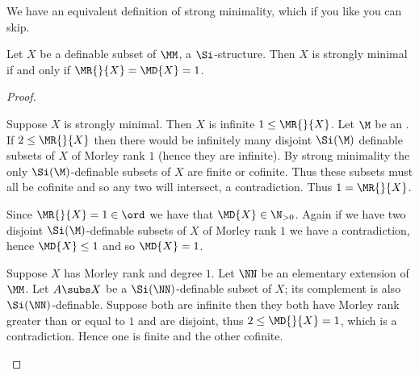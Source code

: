 We have an equivalent definition of strong minimality, 
which if you like you can skip.
\begin{prop}
    Let $X$ be a definable subset of $\MM$, a $\Si$-structure.
    Then $X$ is strongly minimal if and only if $\MR{}{X} = \MD{X} = 1$.
\end{prop}
\begin{proof}
    \begin{forward}
        Suppose $X$ is strongly minimal.
        Then $X$ is infinite 
         $1 \leq \MR{}{X}$.
        Let $\M$ be an 
        .
        If $2 \leq \MR{}{X}$ then there would be infinitely many 
        disjoint $\Si(\M)$ definable subsets of $X$ of Morley rank $1$
        (hence they are infinite).
        By strong minimality the only 
        $\Si(\M)$-definable subsets of $X$ are finite or cofinite.
        Thus these subsets must all be cofinite
        and so any two will intersect, a contradiction.
        Thus $1 = \MR{}{X}$.

        Since $\MR{}{X} = 1 \in \ord$ we have that $\MD{X} \in \N_{>0}$.
        Again if we have two disjoint 
        $\Si(\M)$-definable subsets of $X$ of Morley rank $1$ 
        we have a contradiction, hence $\MD{X} \leq 1$ and so $\MD{X} = 1$.
    \end{forward}

    \begin{backward}
        Suppose $X$ has Morley rank and degree $1$.
        Let $\NN$ be an elementary extension of $\MM$. 
        Let $A \subs X$ be a $\Si(\NN)$-definable subset of $X$;
        its complement is also $\Si(\NN)$-definable.
        Suppose both are infinite then they both have Morley rank greater 
        than or equal to $1$ and are disjoint,
        thus $2 \leq \MD{}{X} = 1$, which is a contradiction.
        Hence one is finite and the other cofinite.
    \end{backward}
\end{proof}

